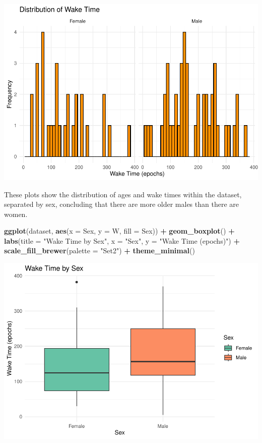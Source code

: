 \documentclass[
]{article}
\newenvironment{Shaded}{\begin{snugshade}}{\end{snugshade}}
\newcommand{\AttributeTok}[1]{\textcolor[rgb]{0.13,0.29,0.53}{#1}}
\newcommand{\FunctionTok}[1]{\textcolor[rgb]{0.13,0.29,0.53}{\textbf{#1}}}
\newcommand{\NormalTok}[1]{#1}
\newcommand{\SpecialCharTok}[1]{\textcolor[rgb]{0.81,0.36,0.00}{\textbf{#1}}}
\newcommand{\StringTok}[1]{\textcolor[rgb]{0.31,0.60,0.02}{#1}}
\begin{document}
\includegraphics{602_project_files/figure-latex/unnamed-chunk-15-2.pdf}

These plots show the distribution of ages and wake times within the
dataset, separated by sex, concluding that there are more older males
than there are women.

\begin{Shaded}
\begin{Highlighting}[]
\FunctionTok{ggplot}\NormalTok{(dataset, }\FunctionTok{aes}\NormalTok{(}\AttributeTok{x =}\NormalTok{ Sex, }\AttributeTok{y =}\NormalTok{ W, }\AttributeTok{fill =}\NormalTok{ Sex)) }\SpecialCharTok{+} 
  \FunctionTok{geom\_boxplot}\NormalTok{() }\SpecialCharTok{+} 
  \FunctionTok{labs}\NormalTok{(}\AttributeTok{title =} \StringTok{"Wake Time by Sex"}\NormalTok{, }\AttributeTok{x =} \StringTok{"Sex"}\NormalTok{, }\AttributeTok{y =} \StringTok{"Wake Time (epochs)"}\NormalTok{) }\SpecialCharTok{+} 
  \FunctionTok{scale\_fill\_brewer}\NormalTok{(}\AttributeTok{palette =} \StringTok{"Set2"}\NormalTok{) }\SpecialCharTok{+} 
  \FunctionTok{theme\_minimal}\NormalTok{()}
\end{Highlighting}
\end{Shaded}

\includegraphics{602_project_files/figure-latex/unnamed-chunk-16-1.pdf}
\end{document}
